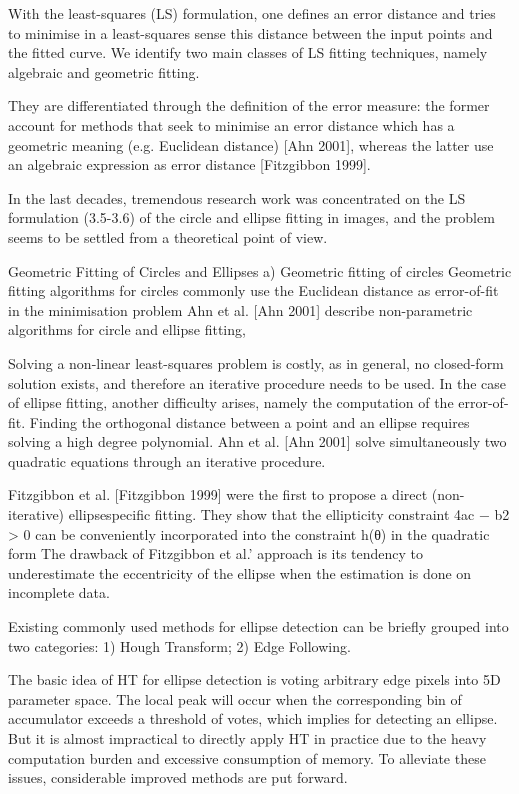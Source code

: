 \documentclass[a4paper]{report}
\begin{document}
With the least-squares (LS) formulation, one defines an error distance and tries to minimise
in a least-squares sense this distance between the input points and the fitted curve. We identify
two main classes of LS fitting techniques, namely algebraic and geometric fitting.

They are differentiated through the definition of the error measure: the former account for methods that
seek to minimise an error distance which has a geometric meaning (e.g. Euclidean distance)
[Ahn 2001], whereas the latter use an algebraic expression
as error distance [Fitzgibbon 1999].

In the last decades, tremendous research work was concentrated on the LS formulation (3.5-3.6)
of the circle and ellipse fitting in images, and the problem seems to be settled from a theoretical
point of view.

Geometric Fitting of Circles and Ellipses
a) Geometric fitting of circles
Geometric fitting algorithms for circles commonly use the Euclidean distance as error-of-fit
in the minimisation problem
Ahn et al. [Ahn 2001] describe non-parametric algorithms for circle and ellipse fitting,

Solving a non-linear least-squares problem is costly, as in general, no closed-form solution
exists, and therefore an iterative procedure needs to be used. In the case of ellipse fitting,
another difficulty arises, namely the computation of the error-of-fit. Finding the orthogonal
distance between a point and an ellipse requires solving a high degree polynomial.
Ahn et al. [Ahn 2001] solve simultaneously two quadratic equations through
an iterative procedure. 

Fitzgibbon et al. [Fitzgibbon 1999] were the first to propose a direct (non-iterative) ellipsespecific
fitting. They show that the ellipticity constraint 4ac − b2 > 0 can be conveniently
incorporated into the constraint h(θ) in the quadratic form
The drawback of Fitzgibbon et al.’
approach is its tendency to underestimate the eccentricity of the ellipse when the estimation is
done on incomplete data.



Existing commonly used methods for ellipse detection can
be briefly grouped into two categories: 1) Hough Transform;
2) Edge Following.

The basic idea of HT for ellipse
detection is voting arbitrary edge pixels into 5D parameter
space. The local peak will occur when the corresponding bin
of accumulator exceeds a threshold of votes, which implies
for detecting an ellipse. But it is almost impractical to directly
apply HT in practice due to the heavy computation burden and
excessive consumption of memory. To alleviate these issues,
considerable improved methods are put forward.
\end{document}
